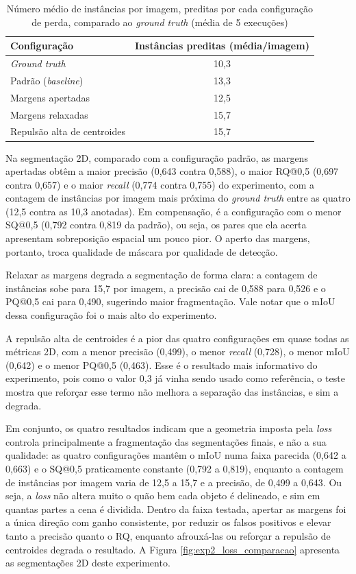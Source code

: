 \begin{table}[h]
\centering
\caption{Número médio de instâncias por imagem, preditas por cada configuração de perda, comparado ao \textit{ground truth} (média de 5 execuções)}
\label{tab:instancias_experimento2}
\begin{tabular}{lc}
\hline
\textbf{Configuração} & \textbf{Instâncias preditas (média/imagem)} \\
\hline
\textit{Ground truth} & 10{,}3 \\
\hline
Padrão (\textit{baseline}) & 13{,}3 \\
Margens apertadas & 12{,}5 \\
Margens relaxadas & 15{,}7 \\
Repulsão alta de centroides & 15{,}7 \\
\hline
\end{tabular}
\end{table}

Na segmentação 2D, comparado com a configuração padrão, as margens apertadas obtêm a maior precisão (0,643 contra 0,588), o maior RQ@0,5 (0,697 contra 0,657) e o maior \textit{recall} (0,774 contra 0,755) do experimento, com a contagem de instâncias por imagem mais próxima do \textit{ground truth} entre as quatro (12,5 contra as 10,3 anotadas). Em compensação, é a configuração com o menor SQ@0,5 (0,792 contra 0,819 da padrão), ou seja, os pares que ela acerta apresentam sobreposição espacial um pouco pior. O aperto das margens, portanto, troca qualidade de máscara por qualidade de detecção. 

Relaxar as margens degrada a segmentação de forma clara: a contagem de instâncias sobe para 15,7 por imagem, a precisão cai de 0,588 para 0,526 e o PQ@0,5 cai para 0,490, sugerindo maior fragmentação. Vale notar que o mIoU dessa configuração foi o mais alto do experimento.

A repulsão alta de centroides é a pior das quatro configurações em quase todas as métricas 2D, com a menor precisão (0,499), o menor \textit{recall} (0,728), o menor mIoU (0,642) e o menor PQ@0,5 (0,463). Esse é o resultado mais informativo do experimento, pois como o valor 0,3 já vinha sendo usado como referência, o teste mostra que reforçar esse termo não melhora a separação das instâncias, e sim a degrada.

Em conjunto, os quatro resultados indicam que a geometria imposta pela \textit{loss} controla principalmente a fragmentação das segmentações finais, e não a sua qualidade: as quatro configurações mantêm o mIoU numa faixa parecida (0,642 a 0,663) e o SQ@0,5 praticamente constante (0,792 a 0,819), enquanto a contagem de instâncias por imagem varia de 12,5 a 15,7 e a precisão, de 0,499 a 0,643. Ou seja, a \textit{loss} não altera muito o quão bem cada objeto é delineado, e sim em quantas partes a cena é dividida. Dentro da faixa testada, apertar as margens foi a única direção com ganho consistente, por reduzir os falsos positivos e elevar tanto a precisão quanto o RQ, enquanto afrouxá-las ou reforçar a repulsão de centroides degrada o resultado. A Figura \ref{fig:exp2_loss_comparacao} apresenta as segmentações 2D deste experimento.


